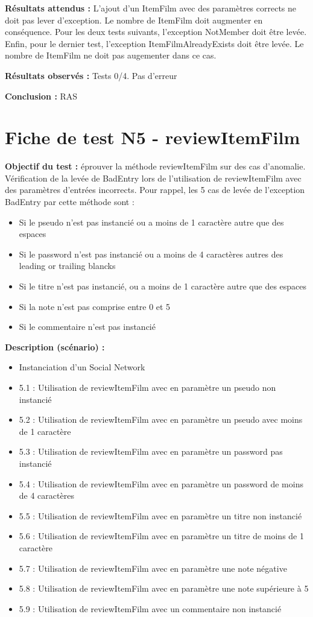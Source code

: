 \documentclass[12pt,a4paper]{report}
\begin{document}
\textbf{Résultats attendus :}
	L'ajout d'un ItemFilm avec des paramètres corrects ne doit pas lever d'exception. Le nombre de ItemFilm doit augmenter en conséquence. Pour les deux tests suivants, l'exception NotMember doit être levée. Enfin, pour le dernier test, l'exception ItemFilmAlreadyExists doit être levée. Le nombre de ItemFilm ne doit pas augementer dans ce cas.

\textbf{Résultats observés :}
Tests 0/4. Pas d'erreur

\textbf{Conclusion :} RAS

\chapter{Fiche de test N5 - reviewItemFilm}

\textbf{Objectif du test :} éprouver la méthode reviewItemFilm sur des cas d'anomalie.
Vérification de la levée de BadEntry lors de l’utilisation de reviewItemFilm avec des paramètres d'entrées incorrects.
Pour rappel, les 5 cas de levée de l'exception BadEntry par cette méthode sont :
\begin{itemize}
	\item	Si le pseudo n'est pas instancié ou a moins de 1 caractère autre que des espaces
	\item	Si le password n'est pas instancié ou a moins de 4 caractères autres des leading or trailing blancks
	\item	Si le titre n'est pas instancié, ou a moins de 1 caractère autre que des espaces
	\item	Si la note n’est pas comprise entre 0 et 5
	\item	Si le commentaire n’est pas instancié
\end{itemize}

\textbf{Description (scénario) :}
\begin{itemize}
	\item	Instanciation d'un Social Network
	\item	5.1 : Utilisation de reviewItemFilm avec en paramètre un pseudo non instancié
	\item	5.2 : Utilisation de reviewItemFilm avec en paramètre un pseudo avec moins de 1 caractère
	\item	5.3 : Utilisation de reviewItemFilm  avec en paramètre un password pas instancié
	\item	5.4 : Utilisation de reviewItemFilm avec en paramètre un password de moins de 4 caractères
	\item   5.5 : Utilisation de reviewItemFilm avec en paramètre un titre non instancié
	\item	5.6 : Utilisation de reviewItemFilm avec en paramètre un titre de moins de 1 caractère
	\item	5.7 : Utilisation de reviewItemFilm avec en paramètre une note négative
	\item	5.8 : Utilisation de reviewItemFilm avec en paramètre une note supérieure à 5
	\item	5.9 : Utilisation de reviewItemFilm avec un commentaire non instancié
\end{itemize}
\end{document}
